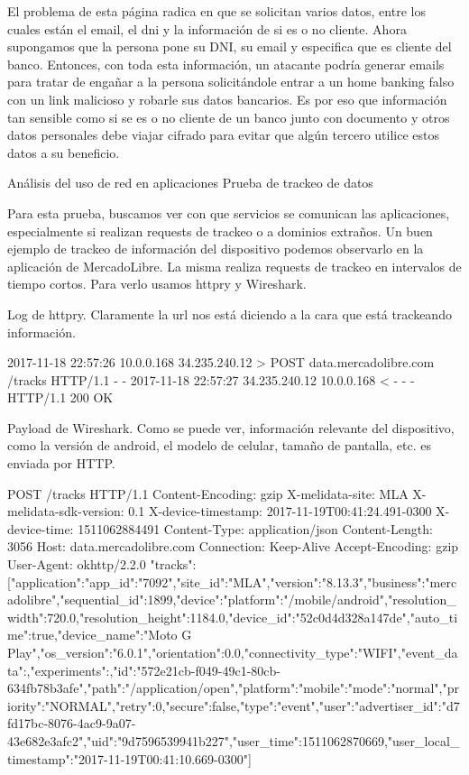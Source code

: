 El problema de esta página radica en que se solicitan varios datos, entre los cuales están el email, el dni y la información de si es o no cliente. Ahora supongamos que la persona pone su DNI, su email y especifica que es cliente del banco. Entonces, con toda esta información, un atacante podría generar emails para tratar de engañar a la persona solicitándole entrar a un home banking falso con un link malicioso y robarle sus datos bancarios. Es por eso que información tan sensible como si se es o no cliente de un banco junto con documento y otros datos personales debe viajar cifrado para evitar que algún tercero utilice estos datos a su beneficio.



Análisis del uso de red en aplicaciones
Prueba de trackeo de datos

Para esta prueba, buscamos ver con que servicios se comunican las aplicaciones, especialmente si realizan requests de trackeo o a dominios extraños. 
Un buen ejemplo de trackeo de información del dispositivo podemos observarlo en la aplicación de MercadoLibre. La misma realiza requests de trackeo en intervalos de tiempo cortos. Para verlo usamos httpry y Wireshark.

Log de httpry. Claramente la url nos está diciendo a la cara que está trackeando información.

2017-11-18 22:57:26	10.0.0.168	34.235.240.12	>	POST	data.mercadolibre.com	/tracks	HTTP/1.1	-	-
2017-11-18 22:57:27	34.235.240.12	10.0.0.168	<	-	-	-	HTTP/1.1	200	OK

Payload de Wireshark. Como se puede ver, información relevante del dispositivo, como la versión de android, el modelo de celular, tamaño de pantalla, etc. es enviada por HTTP.

	POST /tracks HTTP/1.1
Content-Encoding: gzip
X-melidata-site: MLA
X-melidata-sdk-version: 0.1
X-device-timestamp: 2017-11-19T00:41:24.491-0300
X-device-time: 1511062884491
Content-Type: application/json
Content-Length: 3056
Host: data.mercadolibre.com
Connection: Keep-Alive
Accept-Encoding: gzip
User-Agent: okhttp/2.2.0	"tracks":[{"application":{"app_id":"7092","site_id":"MLA","version":"8.13.3","business":"mercadolibre"},"sequential_id":1899,"device":{"platform":"/mobile/android","resolution_width":720.0,"resolution_height":1184.0,"device_id":"52c0d4d328a147de","auto_time":true,"device_name":"Moto G Play","os_version":"6.0.1","orientation":0.0,"connectivity_type":"WIFI"},"event_data":{},"experiments":{},"id":"572e21cb-f049-49c1-80cb-634fb78b3afe","path":"/application/open","platform":{"mobile":{"mode":"normal"}},"priority":"NORMAL","retry":0,"secure":false,"type":"event","user":{"advertiser_id":"d7fd17bc-8076-4ac9-9a07-43e682e3afc2","uid":"9d7596539941b227"},"user_time":1511062870669,"user_local_timestamp":"2017-11-19T00:41:10.669-0300"}]

